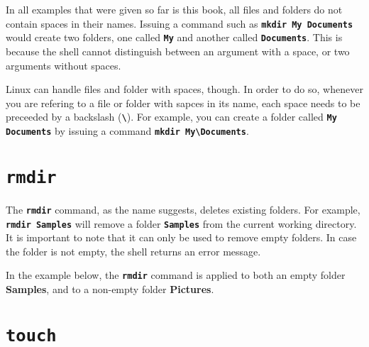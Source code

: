 \begin{my_box}
  In all examples that were given so far is this book, all files and folders do not contain spaces in their names. Issuing a command such as \textbf{\texttt{mkdir My Documents}} would create two folders, one called \textbf{\texttt{My}} and another called \textbf{\texttt{Documents}}. This is because the shell cannot distinguish between an argument with a space, or two arguments without spaces.

  Linux can handle files and folder with spaces, though. In order to do so, whenever you are refering to a file or folder with sapces in its name, each space needs to be preceeded by a backslash (\textbf{\texttt{\textbackslash}}). For example, you can create a folder called \textbf{\texttt{My Documents}} by issuing a command \textbf{\texttt{mkdir My\textbackslash Documents}}.
\end{my_box}


\section{\textbf{\texttt{rmdir}}}

The \textbf{\texttt{rmdir}} command, as the name suggests, deletes existing folders. For example, \textbf{\texttt{rmdir Samples}} will remove a folder \textbf{\texttt{Samples}} from the current working directory. It is important to note that it can only be used to remove empty folders. In case the folder is not empty, the shell returns an error message.

In the example below, the \textbf{\texttt{rmdir}} command is applied to both an empty folder \textbf{Samples}, and to a non-empty folder \textbf{Pictures}.

\section{\textbf{\texttt{touch}}}

